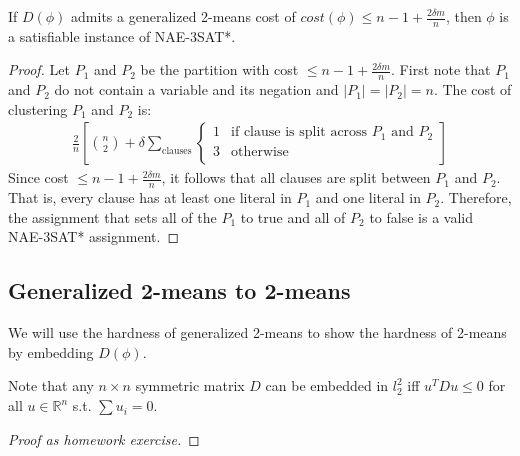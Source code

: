\begin{lemma} \label{satisfiable-instance}
If $D(\phi)$  admits a generalized 2-means cost of $cost(\phi) \le n -
1 + \frac{2\delta m}{n}$, then $\phi$ is a satisfiable instance of
NAE-3SAT*. 
\end{lemma}

\begin{proof}
Let $P_1$ and $P_2$ be the partition with cost $\le n - 1 +
\frac{2\delta m}{n}$.  First note that $P_1$ and $P_2$ do not contain
a variable and its negation and $|P_1| = |P_2| = n$.  The cost of
clustering $P_1$ and $P_2$ is:
\begin{align*}
  \frac{2}{n} \left[ {n \choose 2} + \delta \sum_{\textrm{clauses}} 
  \begin{cases}
    1 & \textrm{if clause is split across $P_1$ and $P_2$}\\  
    3 & \textrm{otherwise} \\ 
  \end{cases}\right]
\end{align*}
Since cost $\le n - 1 + \frac{2\delta m}{n}$, it follows that all
clauses are split between $P_1$ and $P_2$.  That is, every clause has
at least one literal in $P_1$ and one literal in $P_2$.  Therefore,
the assignment that sets all of the $P_1$ to true and all of $P_2$ to
false is a valid NAE-3SAT* assignment. 
\end{proof}



\subsection{Generalized 2-means to 2-means}
We will use the hardness of generalized 2-means to show the hardness
of 2-means by embedding $D(\phi)$.
\begin{fact}
Note that any $n \times n$ symmetric matrix $D$ can be embedded in
$l_2^2$ iff $u^TDu  \le 0$ for all $u \in \mathbb{R}^n$ s.t. $\sum u_i
= 0$. 
\end{fact}
\begin{proof}[Proof as homework exercise]
\end{proof}

